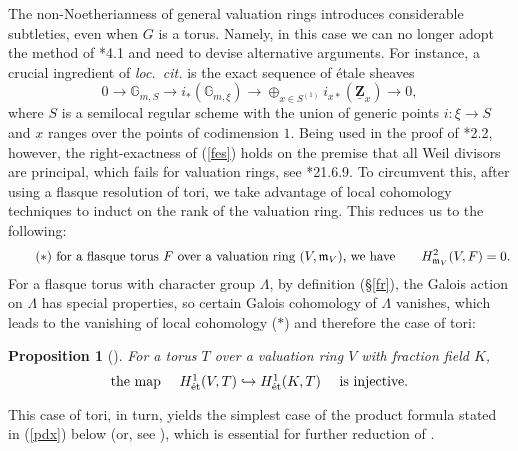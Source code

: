 \documentclass[a4paper,11pt,reqno]{amsart}
\newcommand{\GGL}{\Lambda}
\newcommand{\bG}{\mathbb{G}}
\newcommand{\fm}{\mathfrak{m}}
\newcommand{\ra}{\rightarrow}
\newcommand{\hra}{\hookrightarrow}
\newcommand{\un}{\underline}
\renewcommand{\b}{\textbf}
\newcommand{\et}{\mathrm{\acute{e}t}}	                                           %
\newcommand{\be}{\begin{equation}}
\newcommand{\ee}{\end{equation}}
\newcommand{\bprop}{\begin{prop}}
\newcommand{\eprop}{\end{prop}}
\newcommand{\q}{\quad}
\newcommand{\qq}{\quad\quad}
\theoremstyle{plain}
\newtheorem{prop}[numberingbase]{Proposition}
\theoremstyle{remark}
\theoremstyle{definition}
\theoremstyle{plain}
\theoremstyle{definition}
\theoremstyle{subsection-tweak}
\theoremstyle{subsection-tweak}
\numberwithin{equation}{subsection}
\begin{document}
      The non-Noetherianness of general valuation rings introduces considerable subtleties, even when $G$ is a torus.
      Namely, in this case we can no longer adopt the method of \cite{CTS87}*{4.1} and need to devise alternative arguments.
      For instance, a crucial ingredient of \emph{loc.~cit.} is the exact sequence of \'etale sheaves
       \be\label{fes}
       0\ra \bG_{m, S}\ra i_{\ast}(\bG_{m,\xi})\ra \oplus_{x\in S^{(1)}}i_{x \ast}(\un{\b{Z}}_{x})\ra 0,
       \ee
      where $S$ is a semilocal regular scheme with the union of generic points $i: \xi\ra S$ and $x$ ranges over the points of codimension $1$.
      Being used in the proof of \cite{CTS87}*{2.2}, however, the right-exactness of (\ref{fes}) holds on the premise that all Weil divisors are principal, which fails for valuation rings, see \cite{EGAIV4}*{21.6.9}.
      To circumvent this, after using a flasque resolution of tori, we take advantage of local cohomology techniques to induct on the rank of the valuation ring.
      This reduces us to the following:
       \[
        \text{\tag{$\ast$} for a flasque torus $F$ over a valuation ring $(V,\fm_V)$, we have\qq  $H^2_{\fm_V}(V,F)=0$.}
       \]
      For a flasque torus with character group $\GGL$, by definition (\S\ref{fr}), the Galois action on $\GGL$ has special properties, so certain Galois cohomology of $\GGL$ vanishes, which leads to the vanishing of local cohomology ($\ast$) and therefore the case of tori:
      \bprop[]
          For a torus $T$ over a valuation ring $V$ with fraction field $K$,
      \[\textstyle \text{the map \q $H^1_{\et}(V,T)\hra H^1_{\et}(K,T)$ \q is injective.}
      \]
      \eprop
      This case of tori, in turn, yields the simplest case of the product formula stated in (\ref{pdx}) below (or, see ), which is essential for further reduction of .
      
\end{document}
